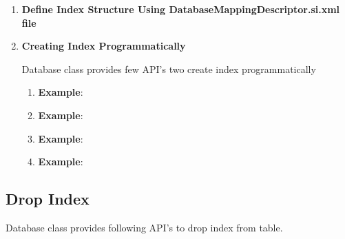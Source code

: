 		\begin{enumerate}
		
			\item \small \textbf{Define Index Structure Using DatabaseMappingDescriptor.si.xml file}
				
								
	
			\item \small \textbf{Creating Index Programmatically}
				\par 
				Database class provides few API's two create index programmatically

				\begin{enumerate}

					\item \small 

						\par
						\textbf{Example}: 
							

					\item \small 

						\par
						\textbf{Example}: 
							

					\item \small 

						\par
						\textbf{Example}:
							

					\item \small 

						\par
						\textbf{Example}:
							

				\end{enumerate}
			

		\end{enumerate}

	\subsection{Drop Index}
		\par 
		Database class provides following API's to drop index from table.
		
